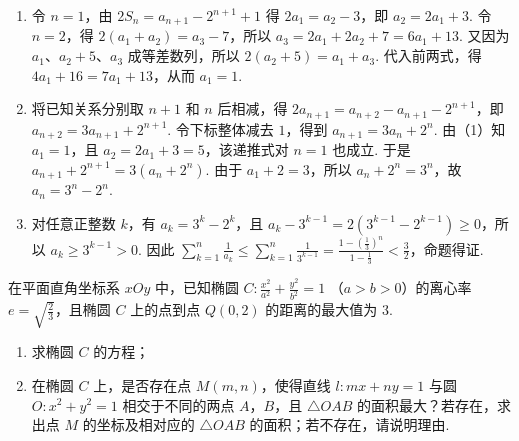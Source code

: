 \begin{solution}
\begin{enumerate}
\item 令 \(n=1\)，由 \(2S_n=a_{n+1}-2^{n+1}+1\) 得 \(2a_1=a_2-3\)，即 \(a_2=2a_1+3\). 令 \(n=2\)，得 \(2(a_1+a_2)=a_3-7\)，所以 \(a_3=2a_1+2a_2+7=6a_1+13\). 又因为 \(a_1\)、\(a_2+5\)、\(a_3\) 成等差数列，所以 \(2(a_2+5)=a_1+a_3\). 代入前两式，得 \(4a_1+16=7a_1+13\)，从而 \(a_1=1\).
\item 将已知关系分别取 \(n+1\) 和 \(n\) 后相减，得
\(2a_{n+1}=a_{n+2}-a_{n+1}-2^{n+1}\)，即 \(a_{n+2}=3a_{n+1}+2^{n+1}\). 令下标整体减去 \(1\)，得到 \(a_{n+1}=3a_n+2^n\). 由（1）知 \(a_1=1\)，且 \(a_2=2a_1+3=5\)，该递推式对 \(n=1\) 也成立. 于是
\(a_{n+1}+2^{n+1}=3(a_n+2^n)\). 由于 \(a_1+2=3\)，所以 \(a_n+2^n=3^n\)，故 \(a_n=3^n-2^n\).
\item 对任意正整数 \(k\)，有 \(a_k=3^k-2^k\)，且
\(a_k-3^{k-1}=2\left(3^{k-1}-2^{k-1}\right)\geqslant0\)，所以 \(a_k\geqslant3^{k-1}>0\). 因此
\(\displaystyle\sum_{k=1}^{n}\frac{1}{a_k}\leqslant\sum_{k=1}^{n}\frac{1}{3^{k-1}}=\frac{1-(\frac{1}{3})^n}{1-\frac{1}{3}}<\frac{3}{2}\)，命题得证.
\end{enumerate}
\end{solution}

\begin{problem}
在平面直角坐标系 \(xOy\) 中，已知椭圆 \(C: \frac{x^{2}}{a^{2}} + \frac{y^{2}}{b^{2}} = 1\) （\(a > b > 0\)）的离心率 \(e = \sqrt{\frac{2}{3}}\)，且椭圆 \(C\) 上的点到点 \(Q(0,2)\) 的距离的最大值为 \(3\).
\begin{enumerate}
\item 求椭圆 \(C\) 的方程；
\item 在椭圆 \(C\) 上，是否存在点 \(M(m, n)\)，使得直线 \(l: mx + ny = 1\) 与圆 \(O: x^2 + y^2 = 1\) 相交于不同的两点 \(A\)，\(B\)，且 \(\triangle OAB\) 的面积最大？若存在，求出点 \(M\) 的坐标及相对应的 \(\triangle OAB\) 的面积；若不存在，请说明理由.
\end{enumerate}
\end{problem}

